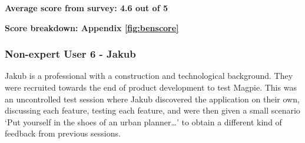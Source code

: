 \textbf{Average score from survey: 4.6 out of 5}

\hspace{2em}\textbf{Score breakdown: Appendix \ref{fig:benscore}}

\newpage{}

\subsubsection{Non-expert User 6 - Jakub}
Jakub is a professional with a construction and technological background. They
were recruited towards the end of product development to test Magpie. This was
an uncontrolled test session where Jakub discovered the application on their
own, discussing each feature, testing each feature, and were then given a small
scenario `Put yourself in the shoes of an urban planner\ldots' to obtain a
different kind of feedback from previous sessions.


